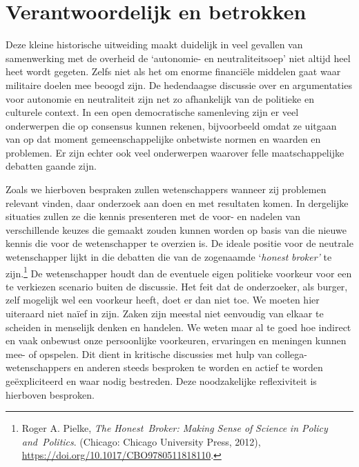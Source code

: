 \documentclass[smallauthor, chapterhaspagenum, nochapterinheader, pagenuminheader,  bigchapnum,medium2, tocpages,  garamond, titleinheader]{jote-book}
\begin{document}
	\section{Verantwoordelijk en betrokken}



	Deze kleine historische uitweiding maakt duidelijk in veel gevallen van samenwerking met de overheid de ‘autonomie- en neutraliteitsoep' niet altijd heel heet wordt gegeten. Zelfs niet als het om enorme financiële middelen gaat waar militaire doelen mee beoogd zijn. De hedendaagse discussie over en argumentaties voor autonomie en neutraliteit zijn net zo afhankelijk van de politieke en culturele context. In een open democratische samenleving zijn er veel onderwerpen die op consensus kunnen rekenen, bijvoorbeeld omdat ze uitgaan van op dat moment gemeenschappelijke onbetwiste normen en waarden en problemen. Er zijn echter ook veel onderwerpen waarover felle maatschappelijke debatten gaande zijn.



	Zoals we hierboven bespraken zullen wetenschappers wanneer zij problemen relevant vinden, daar onderzoek aan doen en met resultaten komen. In dergelijke situaties zullen ze die kennis presenteren met de voor- en nadelen van verschillende keuzes die gemaakt zouden kunnen worden op basis van die nieuwe kennis die voor de wetenschapper te overzien is. De ideale positie voor de neutrale wetenschapper lijkt in die debatten die van de zogenaamde ‘\emph{honest}\emph{ broker' }te zijn.\footnote{Roger A. Pielke, \emph{The }\emph{Honest}\emph{ Broker: Making Sense of }\emph{Science}\emph{ in Policy }\emph{and}\emph{ Politics}. (Chicago: Chicago University Press, 2012), \href{about:blank}{https://doi.org/10.1017/CBO9780511818110}.} De wetenschapper houdt dan de eventuele eigen politieke voorkeur voor een te verkiezen scenario buiten de discussie. Het feit dat de onderzoeker, als burger, zelf mogelijk wel een voorkeur heeft, doet er dan niet toe. We moeten hier uiteraard niet naïef in zijn. Zaken zijn meestal niet eenvoudig van elkaar te scheiden in menselijk denken en handelen. We weten maar al te goed hoe indirect en vaak onbewust onze persoonlijke voorkeuren, ervaringen en meningen kunnen mee- of opspelen. Dit dient in kritische discussies met hulp van collega-wetenschappers en anderen steeds besproken te worden en actief te worden geëxpliciteerd en waar nodig bestreden. Deze noodzakelijke reflexiviteit is hierboven besproken.
\end{document}
